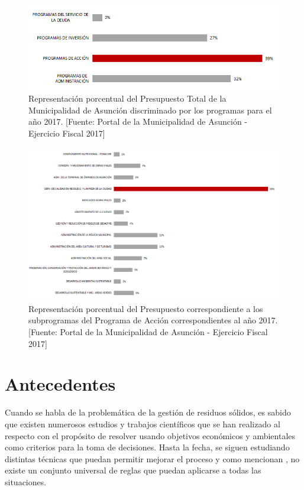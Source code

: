 \begin{figure}[H]
    \centering
    \includegraphics[width=14.5cm]{20181119_PresupuestoTotal2017.png}
    \caption{Representación porcentual del Presupuesto Total de la Municipalidad de Asunción discriminado por los programas para el año 2017. [Fuente: Portal de la Municipalidad de Asunción - Ejercicio Fiscal 2017]}
    \label{fig:porcentajePresupuesto}
\end{figure}

\begin{figure}[H]
    \centering
    \includegraphics[width=15cm]{20181119_PresupuestoAccion2017.png}
    \caption{ Representación porcentual del Presupuesto correspondiente a los subprogramas del Programa de Acción correspondientes al año 2017. [Fuente: Portal de la Municipalidad de Asunción - Ejercicio Fiscal 2017]}
    \label{fig:programaAccion}
\end{figure}

\section{Antecedentes}

Cuando se habla de la problemática de la gestión de residuos sólidos, es sabido que existen numerosos estudios y trabajos científicos que se han realizado al respecto con el propósito de resolver usando objetivos económicos y ambientales como criterios para la toma de decisiones. Hasta la fecha, se siguen estudiando distintas técnicas que puedan permitir mejorar el proceso y como mencionan \citet{Tchobanoglous1993IntegratedIssues}, no existe un conjunto universal de reglas que puedan aplicarse a todas las situaciones.

